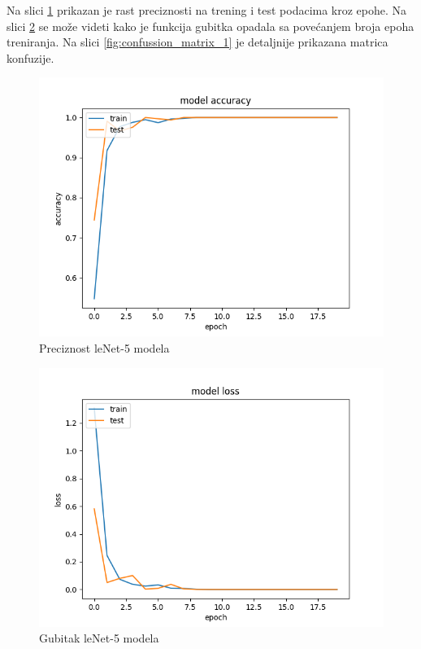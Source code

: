 \documentclass[a4paper]{article}
\begin{document}
Na slici \ref{fig:accuracy_1} prikazan je rast preciznosti na trening i test podacima kroz epohe. Na slici \ref{fig:loss_1} se može videti kako je funkcija gubitka opadala sa povećanjem broja epoha treniranja. Na slici \ref{fig:confussion_matrix_1} je detaljnije prikazana matrica konfuzije.

\begin{figure}[h!]
\begin{center}
\includegraphics[scale=0.4]{accuracy_1.png}
\end{center}
\caption{Preciznost leNet-5 modela}
\label{fig:accuracy_1}
\end{figure}

\begin{figure}[h!]
\begin{center}
\includegraphics[scale=0.4]{loss_1.png}
\end{center}
\caption{Gubitak leNet-5 modela}
\label{fig:loss_1}
\end{figure}
\end{document}
